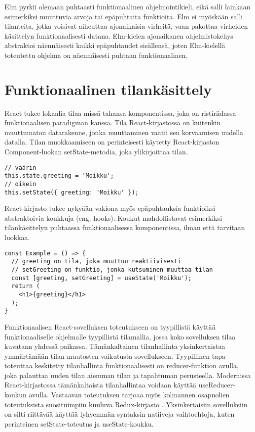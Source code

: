 Elm pyrkii olemaan puhtaasti funktionaalinen ohjelmointikieli, eikä salli lainkaan esimerkiksi muuttuvia arvoja tai
epäpuhtaita funktioita. Elm ei myöskään salli tilanteita, jotka voisivat aiheuttaa ajonaikaisia virheitä, vaan pakottaa
virheiden käsittelyn funktionaalisesti datana. Elm-kielen ajonaikanen ohjelmistokehys abstraktoi näennäisesti kaikki
epäpuhtaudet sisällensä, joten Elm-kielellä toteutettu ohjelma on näennäisesti puhtaan funktionaalinen. \cite{elmlang}

\section{Funktionaalinen tilankäsittely}
React tukee lokaalia tilaa missä tahansa komponentissa, joka on ristiriidassa funktionaalisen paradigman kanssa. Tila
React-kirjastossa on kuitenkin muuttumaton datarakenne, jonka muuttaminen vaatii sen korvaamisen uudella datalla. Tilan
muokkaamiseen on perinteisesti käytetty React-kirjaston Component-luokan setState-metodia, joka ylikirjoittaa tilan.
\begin{verbatim}
// väärin
this.state.greeting = 'Moikku';
// oikein
this.setState({ greeting: 'Moikku' });
\end{verbatim}
React-kirjasto tukee nykyään vakiona myös epäpuhtauksia funktioiksi abstraktoivia koukkuja (eng. hooks). Koukut
mahdollistavat esimerkiksi tilankäsittelyn puhtaassa funktionaalisessa komponentissa, ilman että tarvitaan luokkaa.
\begin{verbatim}
const Example = () => {
  // greeting on tila, joka muuttuu reaktiivisesti
  // setGreeting on funktio, jonka kutsuminen muuttaa tilan
  const [greeting, setGreeting] = useState('Moikku');
  return (
    <h1>{greeting}</h1>
  );
}
\end{verbatim}

Funktionaalisen React-sovelluksen toteutukseen on tyypillistä käyttää funktionaaliselle ohjelmalle tyypillistä
tilamallia, jossa koko sovelluksen tilaa kuvataan yhdessä paikassa. Tämänkaltainen tilanhallinta yksinkertaistaa
ymmärtämään tilan muutosten vaikutusta sovellukseen. Tyypillinen tapa toteuttaa keskitetty tilanhallinta
funktionaalisesti on reducer-funktion avulla, joka palauttaa uuden tilan aiemman tilan ja tapahtuman perusteella.
Modernissa React-kirjastossa tämänkaltaista tilanhallintaa voidaan käyttää useReducer-koukun avulla. Vastaavan
toteutuksen tarjoaa myös kolmannen osapuolien toteutuksista suosituimpiin kuuluva Redux-kirjasto
\cite{functionalwebdev}. Yksinkertaisiin sovelluksiin on silti riittävää käyttää lyhyemmän syntaksin natiiveja
vaihtoehtoja, kuten perinteinen setState-toteutus ja useState-koukku. \cite{reactjs}

